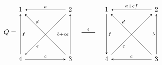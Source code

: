 \documentclass[11pt, letterpaper]{amsart}
\theoremstyle{definition}
\numberwithin{equation}{section}
\newcommand{\mutation}[1]{\stackrel{#1}{\rule[.5ex]{2em}{0.5pt}}}
\begin{document}
\begin{figure}[ht]
\vspace{-.1in}
\begin{equation*}
\begin{array}{ccccc}
\hspace{-17pt}Q=\!\!
\begin{tikzcd}[arrows={-stealth}, column sep=60, row sep=60]
  1  \arrow[r,  "a", \snsl] \arrow[dr, "d" near start, outer sep=-.8, \snsl]  \arrow[d, "f", \snsl]  
  & 2  \arrow[d, swap, "b+ce", \snsl] \arrow[dl, "e", near end, outer sep=-.8, \sns]
  \\
   4 
   & 3  \arrow[l, "c", swap, \snsl] 
\end{tikzcd}


 &\mutation 4 &
 \begin{tikzcd}[arrows={-stealth}, column sep=60, row sep=60]
  1  \arrow[r,  "a+ef", \snsl] \arrow[dr, "d" near start, outer sep=-.8, \snsl]  \arrow[d, "f", \sns]  
  & 2  \arrow[d, swap, "b", \snsl] \arrow[dl, "e", near end, outer sep=-.8, \snsl]
  \\
   4 
   & 3  \arrow[l, "c", swap, \sns] 
\end{tikzcd}
 

\end{array}
\end{equation*}
\end{figure}
\end{document}
